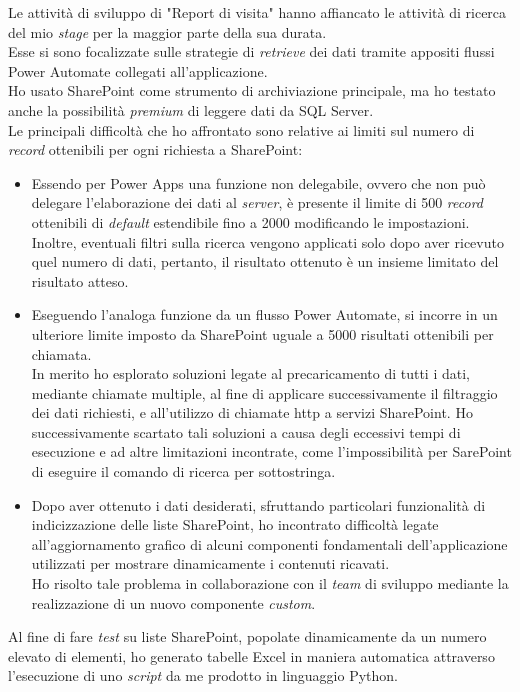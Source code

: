 \noindent Le attività di sviluppo di "Report di visita" hanno affiancato le attività di ricerca del mio \emph{stage} per la maggior parte della sua durata.\\
Esse si sono focalizzate sulle strategie di \emph{retrieve} dei dati tramite appositi flussi Power Automate collegati all'applicazione.\\
Ho usato SharePoint come strumento di archiviazione principale, ma ho testato anche la possibilità \emph{premium} di leggere dati da SQL Server.\\
Le principali difficoltà che ho affrontato sono relative ai limiti sul numero di \emph{record} ottenibili per ogni richiesta a SharePoint:
\begin{itemize}
    \item Essendo per Power Apps una funzione non delegabile, ovvero che non può delegare l'elaborazione dei dati al \emph{server}, è presente il limite di 500 \emph{record} ottenibili di \emph{default} estendibile fino a 2000 modificando le impostazioni.
    Inoltre, eventuali filtri sulla ricerca vengono applicati solo dopo aver ricevuto quel numero di dati, pertanto, il risultato ottenuto è un insieme limitato del risultato atteso.
    \item Eseguendo l'analoga funzione da un flusso Power Automate, si incorre in un ulteriore limite imposto da SharePoint uguale a 5000 risultati ottenibili per chiamata.\\
    In merito ho esplorato soluzioni legate al precaricamento di tutti i dati, mediante chiamate multiple, al fine di applicare successivamente il filtraggio dei dati richiesti, e all'utilizzo di chiamate \gls{http} a servizi SharePoint.
    Ho successivamente scartato tali soluzioni a causa degli eccessivi tempi di esecuzione e ad altre limitazioni incontrate, come l'impossibilità per SarePoint di eseguire il comando di ricerca per sottostringa.
    \item Dopo aver ottenuto i dati desiderati, sfruttando particolari funzionalità di indicizzazione delle liste SharePoint, ho incontrato difficoltà legate all'aggiornamento grafico di alcuni componenti fondamentali dell'applicazione utilizzati per mostrare dinamicamente i contenuti ricavati.\\
    Ho risolto tale problema in collaborazione con il \emph{team} di sviluppo mediante la realizzazione di un nuovo componente \emph{custom}.  
\end{itemize}
Al fine di fare \emph{test} su liste SharePoint, popolate dinamicamente da un numero elevato di elementi, ho generato tabelle Excel in maniera automatica attraverso l'esecuzione di uno \emph{script} da me prodotto in linguaggio Python.

